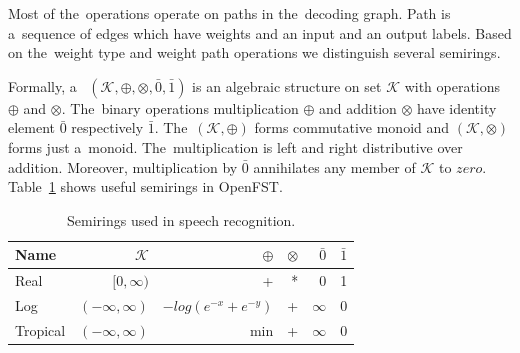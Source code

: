 Most of the~operations operate on paths in the~decoding graph.
Path is a~sequence of edges which have weights and an input and an output labels.
Based on the~weight type and weight path operations we distinguish several semirings. 

Formally, a~ $(\mathcal{K}, \oplus, \otimes, \bar{0}, \bar{1})$ is an algebraic structure on set $\mathcal{K}$ with operations $\oplus$ and $\otimes$.
The~binary operations multiplication $\oplus$ and addition $\otimes$ have identity element $\bar{0}$ respectively $\bar{1}$. 
The~$(\mathcal{K}, \oplus)$ forms commutative monoid and $(\mathcal{K}, \otimes)$ forms just a~monoid.
The~multiplication is left and right distributive over addition.
Moreover, multiplication by $\bar{0}$ annihilates any member of $\mathcal{K}$ to $zero$. 
Table~\ref{tab:semiring} shows useful semirings in OpenFST.

\begin{table}[!htp]\label{tab:semiring}
\begin{center}
\begin{tabular}{lrrrrr}
\hline
Name & $\mathcal{K}$ & $\oplus$ & $ \otimes$ & $\bar{0}$ & $\bar{1}$ \\ 
\hline
Real        & $[0,\infty)$        &  +                     &  * &  0        &  1  \\
Log         & $(-\infty, \infty)$ & $-log(e^{-x} + e^{-y})$ & + &  $\infty$ &  0  \\
Tropical    & $(-\infty, \infty)$ &  min                   &  + &  $\infty$ &  0  \\
\hline
\end{tabular}
\caption{Semirings used in speech recognition.\cite{openfst_web}}
\end{center}
\end{table}
